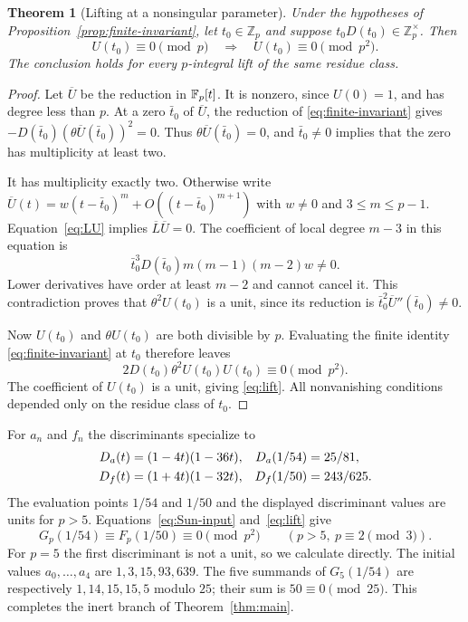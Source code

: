 \documentclass[11pt,a4paper]{article}
\newtheorem{theorem}{Theorem}[section]
\theoremstyle{remark}\newtheorem{remark}[theorem]{Remark}
\newcommand{\Z}{\mathbb Z}\newcommand{\Q}{\mathbb Q}
\begin{document}
\begin{theorem}[Lifting at a nonsingular parameter]\label{thm:lift}
Under the hypotheses of Proposition~\ref{prop:finite-invariant}, let
$t_0\in\Z_p$ and suppose $t_0D(t_0)\in\Z_p^\times$.
Then
\begin{equation}\label{eq:lift}
 U(t_0)\equiv0\pmod p\quad\Longrightarrow\quad
 U(t_0)\equiv0\pmod{p^2}.
\end{equation}
The conclusion holds for every $p$-integral lift of the same residue class.
\end{theorem}
\begin{proof}
Let $\overline U$ be the reduction in $\mathbb F_p[t]$. It is nonzero, since
$U(0)=1$, and has degree less than $p$. At a zero $\bar t_0$ of
$\overline U$, the reduction of \eqref{eq:finite-invariant} gives
$-D(\bar t_0)(\theta\overline U(\bar t_0))^2=0$.
Thus $\theta\overline U(\bar t_0)=0$, and $\bar t_0\ne0$ implies that
the zero has multiplicity at least two.

It has multiplicity exactly two. Otherwise write
$\overline U(t)=w(t-\bar t_0)^m+O((t-\bar t_0)^{m+1})$ with
$w\ne0$ and $3\le m\le p-1$. Equation~\eqref{eq:LU} implies
$\overline L\overline U=0$. The coefficient of local degree $m-3$ in
this equation is
\[
 \bar t_0^3D(\bar t_0)m(m-1)(m-2)w\ne0.
\]
Lower derivatives have order at least $m-2$ and cannot cancel it.
This contradiction proves that $\theta^2U(t_0)$ is a unit, since its
reduction is $\bar t_0^2\overline U''(\bar t_0)\ne0$.

Now $U(t_0)$ and $\theta U(t_0)$ are both divisible by $p$.
Evaluating the finite identity \eqref{eq:finite-invariant} at $t_0$
therefore leaves
\[
 2D(t_0)\theta^2U(t_0)U(t_0)\equiv0\pmod{p^2}.
\]
The coefficient of $U(t_0)$ is a unit, giving \eqref{eq:lift}.
All nonvanishing conditions depended only on the residue class of $t_0$.
\end{proof}

For $a_n$ and $f_n$ the discriminants specialize to
\begin{align}\label{eq:discriminants}
 D_a(t)&=(1-4t)(1-36t),&D_a(1/54)&=25/81,\notag\\
 D_f(t)&=(1+4t)(1-32t),&D_f(1/50)&=243/625.
\end{align}
The evaluation points $1/54$ and $1/50$ and the displayed discriminant
values are units for $p>5$.
Equations~\eqref{eq:Sun-input} and~\eqref{eq:lift} give
\begin{equation}\label{eq:inert-result}
 G_p(1/54)\equiv F_p(1/50)\equiv0\pmod{p^2}
 \qquad(p>5,\ p\equiv2\pmod3).
\end{equation}
For $p=5$ the first discriminant is not a unit, so we calculate directly.
The initial values $a_0,\ldots,a_4$ are $1,3,15,93,639$.
The five summands of $G_5(1/54)$ are respectively $1,14,15,15,5$ modulo $25$;
their sum is $50\equiv0\pmod{25}$.
This completes the inert branch of Theorem~\ref{thm:main}.
\end{document}
